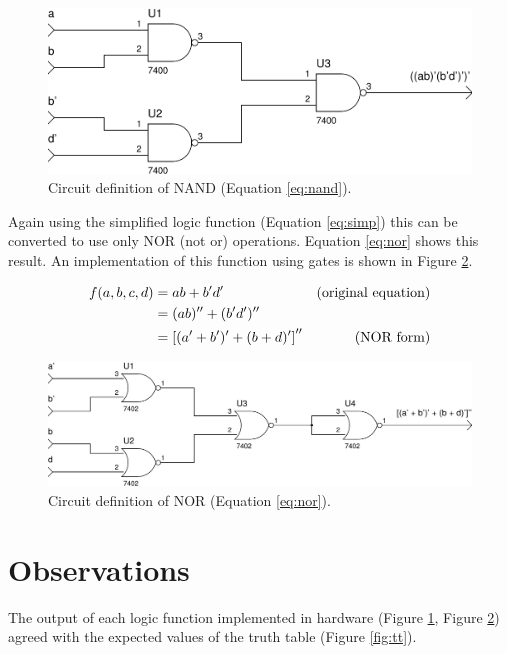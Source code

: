 \documentclass[12pt]{article}
\begin{document}
\begin{figure}[!hbtp]
\center
\includegraphics[scale=0.5]{nand-01}
\caption{Circuit definition of NAND (Equation \ref{eq:nand}).}
\label{fig:nand}
\end{figure}

Again using the simplified logic function (Equation \ref{eq:simp}) this
can be converted to use only NOR (not or) operations.
Equation \ref{eq:nor} shows this result.
An implementation of this function using gates is shown in Figure \ref{fig:nor}.

\begin{align}
f(a,b,c,d) &= a b + b'd' &\mbox{(original equation)} \notag \\
	&= (a b)'' + (b'd')'' \notag \\
	&= \left[ (a' + b')' + (b + d)' \right]'' &\mbox{(NOR form)} \label{eq:nor}
\end{align}

\begin{figure}[!hbtp]
\center
\includegraphics[scale=0.5]{nor-01}
\caption{Circuit definition of NOR (Equation \ref{eq:nor}).}
\label{fig:nor}
\end{figure}

\clearpage

\section{Observations}

The output of each logic function implemented in hardware
(Figure \ref{fig:nand}, Figure \ref{fig:nor}) agreed with the expected values
of the truth table (Figure \ref{fig:tt}).
\end{document}
